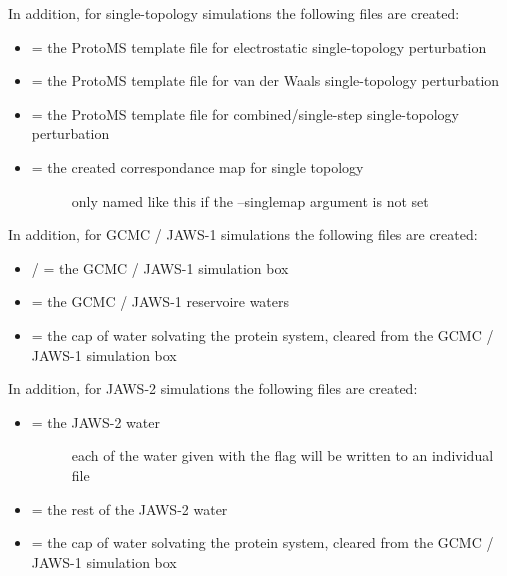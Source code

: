 \documentclass[letterpaper,10pt,english]{sphinxmanual}
\begin{document}
In addition, for single-topology simulations the following files are created:
\begin{itemize}
\item {} 
 = the ProtoMS template file for electrostatic single-topology perturbation

\item {} 
 = the ProtoMS template file for van der Waals single-topology perturbation

\item {} 
 = the ProtoMS template file for combined/single-step single-topology perturbation

\item {} \begin{description}
\item[{ = the created correspondance map for single topology}] \leavevmode
only named like this if the --singlemap argument is not set

\end{description}

\end{itemize}

In addition, for GCMC / JAWS-1 simulations the following files are created:
\begin{itemize}
\item {} 
 /  = the GCMC / JAWS-1 simulation box

\item {} 
 = the GCMC / JAWS-1 reservoire waters

\item {} 
 = the cap of water solvating the protein system, cleared from the GCMC / JAWS-1 simulation box

\end{itemize}

In addition, for JAWS-2 simulations the following files are created:
\begin{itemize}
\item {} \begin{description}
\item[{ = the JAWS-2 water}] \leavevmode
each of the water given with the  flag will be written to an individual file

\end{description}

\item {} 
 = the rest of the JAWS-2 water

\item {} 
 = the cap of water solvating the protein system, cleared from the GCMC / JAWS-1 simulation box

\end{itemize}
\end{document}
